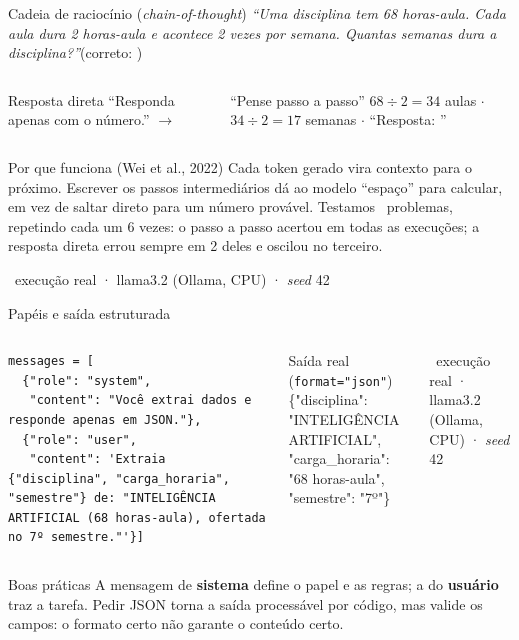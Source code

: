 \documentclass[aspectratio=169]{beamer}
\newcommand{\real}{\textcolor{minegreen}{\tiny\faIcon{flask}\ execução real · llama3.2 (Ollama, CPU) · \textit{seed} 42}}
\begin{document}
\begin{frame}[shrink=5]{Cadeia de raciocínio (\textit{chain-of-thought})}
    \footnotesize \textit{``Uma disciplina tem 68 horas-aula. Cada aula dura 2 horas-aula e acontece 2 vezes por semana. Quantas semanas dura a disciplina?''}\quad (correto: \textbf{\vCOTcerto})
    \begin{columns}[T]
        \begin{block}{Resposta direta}
            \footnotesize ``Responda apenas com o número.'' $\to$ \textcolor{minered}{\textbf{\vCOTdireto}}
        \end{block}
        \begin{block}{``Pense passo a passo''}
            \scriptsize $68 \div 2 = 34$ aulas $\cdot$ $34 \div 2 = 17$ semanas $\cdot$ ``Resposta: \textcolor{minegreen}{\textbf{\vCOTcerto}}''
        \end{block}
    \end{columns}
    \pause
    \begin{alertblock}{Por que funciona (Wei et al., 2022)}
        \footnotesize Cada token gerado vira contexto para o próximo. Escrever os passos intermediários dá ao modelo ``espaço'' para calcular, em vez de saltar direto para um número provável. Testamos \vCOTn\ problemas, repetindo cada um 6 vezes: o passo a passo acertou em todas as execuções; a resposta direta errou sempre em 2 deles e oscilou no terceiro.
    \end{alertblock}
    \real
\end{frame}

\begin{frame}[fragile]{Papéis e saída estruturada}
    \begin{columns}
\begin{lstlisting}
messages = [
  {"role": "system",
   "content": "Você extrai dados e responde apenas em JSON."},
  {"role": "user",
   "content": 'Extraia {"disciplina", "carga_horaria", "semestre"} de: "INTELIGÊNCIA ARTIFICIAL (68 horas-aula), ofertada no 7º semestre."'}]
\end{lstlisting}
        \begin{block}{Saída real (\texttt{format="json"})}
            \scriptsize\ttfamily \{"disciplina": "INTELIGÊNCIA ARTIFICIAL",\\ "carga\_horaria": "68 horas-aula",\\ "semestre": "7º"\}
        \end{block}
        \real
    \end{columns}
    \begin{block}{Boas práticas}
        \footnotesize A mensagem de \textbf{sistema} define o papel e as regras; a do \textbf{usuário} traz a tarefa. Pedir JSON torna a saída processável por código, mas valide os campos: o formato certo não garante o conteúdo certo.
    \end{block}
\end{frame}
\end{document}
